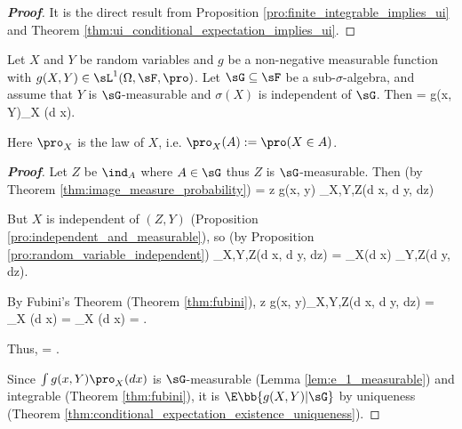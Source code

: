 \begin{proof}[\bf Proof]
It is the direct result from Proposition \ref{pro:finite_integrable_implies_ui} and Theorem \ref{thm:ui_conditional_expectation_implies_ui}. %
\end{proof}




\begin{proposition}
Let $X$ and $Y$ be random variables and $g$ be a non-negative measurable function with $g(X,Y)\in \sL^1(\Omega,\sF,\pro)$. Let $\sG \subseteq \sF$ be a sub-$\sigma$-algebra, and assume that $Y$ is $\sG$-measurable and $\sigma(X)$ is independent of $\sG$. Then
\be
\E[g(X, Y)|\sG] = \int g(x, Y)\pro_X (d x).
\ee

Here $\pro_X$ is the law of $X$, i.e. $\pro_X (A) := \pro(X \in A)$.
\end{proposition}

\begin{proof}[\bf Proof]
Let $Z$ be $\ind_A$ where $A\in \sG$ thus $Z$ is $\sG$-measurable. Then (by Theorem \ref{thm:image_measure_probability})
\be
\E{} = \int z g(x, y) \pro_{X,Y,Z}(d x, d y, dz)
\ee

But $X$ is independent of $(Z, Y)$ (Proposition \ref{pro:independent_and_measurable}), so (by Proposition \ref{pro:random_variable_independent})
\be
\pro_{X,Y,Z}(d x, d y, dz) = \pro_X(d x) \pro_{Y,Z}(d y, dz).
\ee

By Fubini's Theorem (Theorem \ref{thm:fubini}),
\beast
\int z g(x, y)\pro_{X,Y,Z}(d x, d y, dz) = \int {} \pro_X (d x) = \int \E{}\pro_X (d x) = \E {}.
\eeast

Thus,
\be
\E{} = \E {}.
\ee

Since $\int g(x, Y )\pro_X (d x)$ is $\sG$-measurable (Lemma \ref{lem:e_1_measurable}) and integrable (Theorem \ref{thm:fubini}), it is $\E\bb{g(X, Y ) |\sG}$ by uniqueness (Theorem \ref{thm:conditional_expectation_existence_uniqueness}).
\end{proof}




